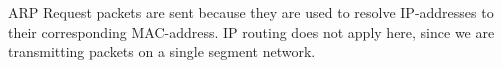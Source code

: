 ARP Request packets are sent because they are used to resolve IP-addresses to their corresponding MAC-address.
IP routing does not apply here, since we are transmitting packets on a single segment network.
